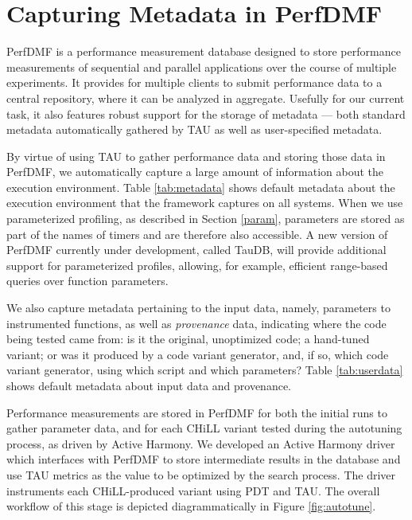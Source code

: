 \documentclass[msthesis,justified,copyright,final,numbers,sort&compress,
gsmodern,amstex,natbib]{uothesis}
\begin{document}
\section{Capturing Metadata in PerfDMF}
\label{perfdmf}

PerfDMF \cite{perfdmf} is a performance measurement database designed to store performance measurements of sequential and parallel applications over the course of multiple experiments. It provides for multiple clients to submit performance data to a central repository, where it can be analyzed in aggregate. Usefully for our current task, it also features robust support for the storage of metadata --- both standard metadata automatically gathered by TAU as well as user-specified metadata.

By virtue of using TAU to gather performance data and storing those data in PerfDMF, we automatically capture a large amount of information about the execution environment. Table \ref{tab:metadata} shows default metadata about the execution environment that the framework captures on all systems. When we use parameterized profiling, as described in Section \ref{param}, parameters are stored as part of the names of timers and are therefore also accessible. A new version of PerfDMF currently under development, called TauDB, will provide additional support for parameterized profiles, allowing, for example, efficient range-based queries over function parameters. 

We also capture metadata pertaining to the input data, namely, parameters to instrumented functions, as well as \emph{provenance} data, indicating where the code being tested came from: is it the original, unoptimized code; a hand-tuned variant; or was it produced by a code variant generator, and, if so, which code variant generator, using which script and which parameters? Table \ref{tab:userdata} shows default metadata about input data and provenance.

Performance measurements are stored in PerfDMF for both the initial runs to gather parameter data, and for each CHiLL variant tested during the autotuning process, as driven by Active Harmony. We developed an Active Harmony driver which interfaces with PerfDMF to store intermediate results in the database and use TAU metrics as the value to be optimized by the search process. The driver instruments each CHiLL-produced variant using PDT and TAU. The overall workflow of this stage is depicted diagrammatically in Figure \ref{fig:autotune}.
\end{document}
